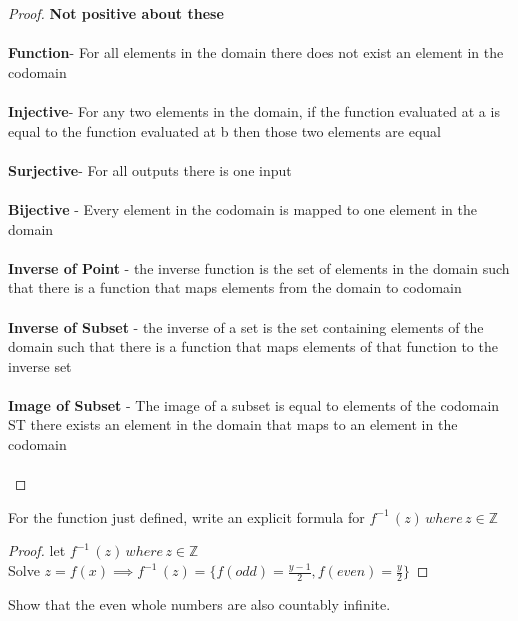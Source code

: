 \documentclass[12pt]{article}
\newcommand{\Z}{\mathbb{Z}}
\newenvironment{question}[2][Question]{\begin{trivlist}
\item[\hskip \labelsep {\bfseries #1}\hskip \labelsep {\bfseries #2.}]}{\end{trivlist}}
\begin{document}
\begin{proof}
\textbf{Not positive about these} \\ \\
\textbf{Function}- For all elements in the domain there does not exist an element in the codomain \\ \\
\textbf{Injective}- For any two elements in the domain, if the function evaluated at a is equal to the function evaluated at b then those two elements are equal \\ \\
\textbf{Surjective}- For all outputs there is one input \\ \\
\textbf{Bijective} - Every element in the codomain is mapped to one element in the domain\\ \\
\textbf{Inverse of Point} - the inverse function is the set of elements in the domain such that there is a function that maps elements from the domain to codomain  \\  \\
\textbf{Inverse of Subset} - the inverse of a set is the set containing elements of the domain such that there is a function that maps elements of that function to the inverse set\\ \\
\textbf{Image of Subset} - The image of a subset is equal to elements of the codomain ST there exists an element in the domain that maps to an element in the codomain \\	\\
\end{proof}


\begin{question}{4}
For the function just defined, write an explicit formula for $f^{-1}\,(z)\,where\, z\in \Z$
\end{question}
 
\begin{proof}
let $f^{-1}\,(z)\,where\, z\in \Z$\\
Solve $z=f(x) \implies f^{-1}\,(z) = \{ f(odd) = \frac{y-1}{2}, f(even)=\frac{y}{2}\}$
\end{proof}

\begin{question}{5}
Show that the even whole numbers are also countably infinite.
\end{question}
 
\end{document}

